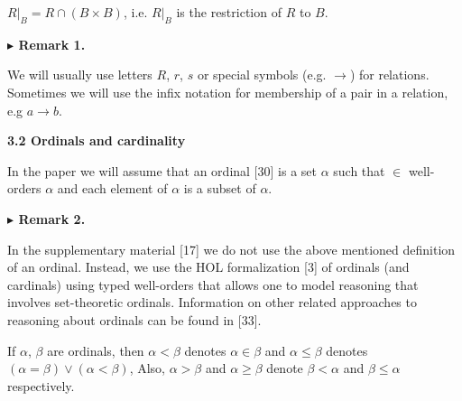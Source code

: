 $R|_{B}=R\cap(B\times B)$, i.e. $R|_{B}$ is the restriction of $R$ to $B$.\par
 
 
  
 
 
\par\medskip\noindent\textbf{$\blacktriangleright$ Remark 1.}\par
 
 
We will usually use letters $R$, $r$, $s$ or special symbols (e.g. $\to$) for relations. Sometimes we will use the infix notation for membership of a pair in a relation, e.g $a\to b$.\par
 
 
 
 
 
\par\medskip\noindent\textbf{3.2 Ordinals and cardinality}\par
 
 
In the paper we will assume that an ordinal [30] is a set $\alpha$ such that $\in$ well-orders $\alpha$ and each element of $\alpha$ is a subset of $\alpha$.\par
 
 
 
\par\medskip\noindent\textbf{$\blacktriangleright$ Remark 2.}\par
 
 
In the supplementary material [17] we do not use the above mentioned definition of an ordinal. Instead, we use the HOL formalization [3] of ordinals (and cardinals) using typed well-orders that allows one to model reasoning that involves set-theoretic ordinals. Information on other related approaches to reasoning about ordinals can be found in [33].\par
 
 
 
 
If $\alpha$, $\beta$ are ordinals, then $\alpha<\beta$ denotes $\alpha\in\beta$ and $\alpha\leq\beta$ denotes $(\alpha=\beta)\vee(\alpha<\beta)$, Also, $\alpha>\beta$ and $\alpha\geq\beta$ denote $\beta<\alpha$ and $\beta\leq\alpha$ respectively.\par
 
